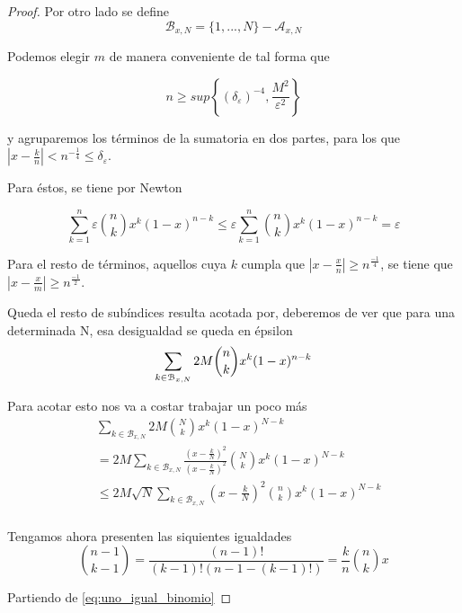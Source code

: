 \begin{proof}
    Por otro lado se define
    $$\mathcal{B}_{x,N} = \{1, ..., N\} - \mathcal{A}_{x,N}$$


    Podemos elegir $m$ de manera conveniente de tal forma que 

    $$ n \geq sup \left\{ (\delta_\varepsilon) ^{-4}, \frac{M^2}{\varepsilon^2}\right\}$$


    y agruparemos los términos de la sumatoria en dos partes, para los que 
    $|x - \frac{k}{n}| < n^{ -\frac{1}{4}} \leq \delta_\varepsilon$. 

    Para éstos,  se tiene por Newton  

    \begin{equation*}
        \sum_{k=1}^n   \varepsilon \binom{n}{k} x^k (1-x)^{n-k} \leq \varepsilon \sum_{k=1}^n \binom{n}{k} x^k (1-x)^{n-k} =  \varepsilon
    \end{equation*}

    Para el resto de términos, aquellos cuya $k$ cumpla que $|x - \frac{x}{n}| \geq n ^\frac{-1}{4}$, se tiene que 
    $|x - \frac{x}{m}| \geq n ^\frac{-1}{2}$. 

    Queda el resto de subíndices resulta acotada por, deberemos de ver que para una determinada N, 
    esa desigualdad se queda en épsilon
    \begin{equation*}
        \sum_{k \in \mathcal{B}_{x,N}} 2M \binom{n}{k} x^k (1-x) ^{n-k} \\
    \end{equation*}

    Para acotar esto nos va a costar trabajar un poco más 
    \begin{equation*}
        \begin{split}
        & \sum_{k \in \mathcal{B}_{x,N}} 2M \binom{N}{k} x^k (1-x) ^{N-k} \\
        & = 2M  \sum_{k \in \mathcal{B}_{x,N}}  \frac{(x- \frac{k}{N})^2}{(x- \frac{k}{N})^2} \binom{N}{k} x^k (1-x) ^{N-k} \\
        & \leq 2M \sqrt{N} \sum_{k \in \mathcal{B}_{x,N}}  (x- \frac{k}{N})^2 \binom{n}{k} x^k (1-x) ^{N-k} \\
    \end{split}
    \end{equation*}


    Tengamos ahora presenten las siquientes igualdades 
    \begin{equation*}
        \binom{n-1}{k-1} = \frac{(n-1)!}{(k-1)! (n-1-(k-1)!)} = \frac{k}{n} \binom{n}{k}x
    \end{equation*}

    Partiendo de \ref{eq:uno_igual_binomio}
    

\end{proof}

 
 
\endinput 
